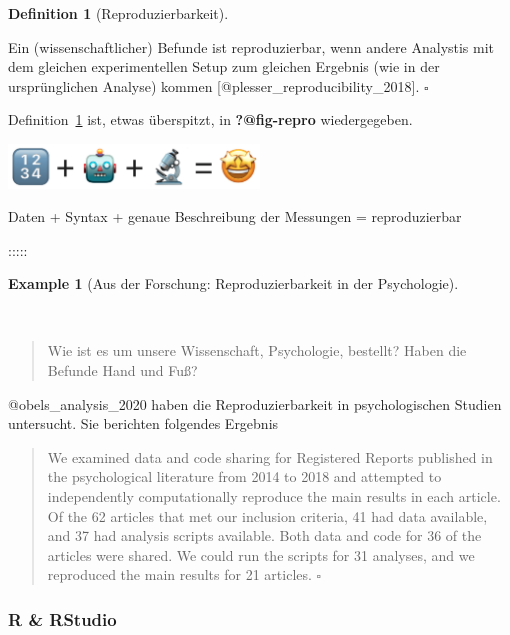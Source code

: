 \documentclass[
  letterpaper,
  DIV=11,
  numbers=noendperiod]{scrartcl}
\theoremstyle{definition}
\theoremstyle{definition}
\newtheorem{example}{Example}[section]
\theoremstyle{definition}
\newtheorem{definition}{Definition}[section]
\theoremstyle{remark}
\begin{document}
\begin{definition}[Reproduzierbarkeit]\protect\hypertarget{def-repro}{}\label{def-repro}

Ein (wissenschaftlicher) Befunde ist reproduzierbar, wenn andere
Analystis mit dem gleichen experimentellen Setup zum gleichen Ergebnis
(wie in der ursprünglichen Analyse) kommen
{[}@plesser\_reproducibility\_2018{]}. \(\square\)

\end{definition}

Definition~\ref{def-repro} ist, etwas überspitzt, in
\textbf{?@fig-repro} wiedergegeben.

\includegraphics[width=0.5\textwidth,height=\textheight]{img/repro-star-struck.png}

Daten + Syntax + genaue Beschreibung der Messungen = reproduzierbar

:::::

\begin{example}[Aus der Forschung: Reproduzierbarkeit in der
Psychologie]\protect\hypertarget{exm-repro}{}\label{exm-repro}

~

\begin{quote}
Wie ist es um unsere Wissenschaft, Psychologie, bestellt? Haben die
Befunde Hand und Fuß?
\end{quote}

@obels\_analysis\_2020 haben die Reproduzierbarkeit in psychologischen
Studien untersucht. Sie berichten folgendes Ergebnis

\begin{quote}
We examined data and code sharing for Registered Reports published in
the psychological literature from 2014 to 2018 and attempted to
independently computationally reproduce the main results in each
article. Of the 62 articles that met our inclusion criteria, 41 had data
available, and 37 had analysis scripts available. Both data and code for
36 of the articles were shared. We could run the scripts for 31
analyses, and we reproduced the main results for 21 articles.
\(\square\)
\end{quote}

\end{example}

\subsubsection{R \& RStudio}\label{r-rstudio}
\end{document}
